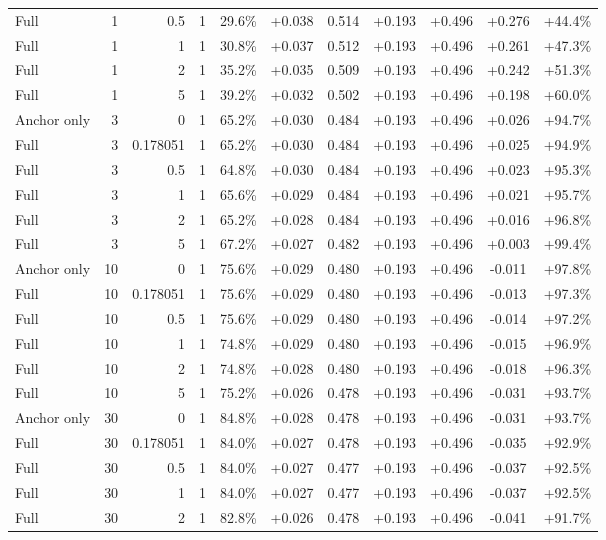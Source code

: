 \begin{table}[htbp]
\begin{tabular}{lrrrccccccc}
Full & 1 & 0.5 & 1 & 29.6\% & +0.038 & 0.514 & +0.193 & +0.496 & +0.276 & +44.4\% \\
Full & 1 & 1 & 1 & 30.8\% & +0.037 & 0.512 & +0.193 & +0.496 & +0.261 & +47.3\% \\
Full & 1 & 2 & 1 & 35.2\% & +0.035 & 0.509 & +0.193 & +0.496 & +0.242 & +51.3\% \\
Full & 1 & 5 & 1 & 39.2\% & +0.032 & 0.502 & +0.193 & +0.496 & +0.198 & +60.0\% \\
Anchor only & 3 & 0 & 1 & 65.2\% & +0.030 & 0.484 & +0.193 & +0.496 & +0.026 & +94.7\% \\
Full & 3 & 0.178051 & 1 & 65.2\% & +0.030 & 0.484 & +0.193 & +0.496 & +0.025 & +94.9\% \\
Full & 3 & 0.5 & 1 & 64.8\% & +0.030 & 0.484 & +0.193 & +0.496 & +0.023 & +95.3\% \\
Full & 3 & 1 & 1 & 65.6\% & +0.029 & 0.484 & +0.193 & +0.496 & +0.021 & +95.7\% \\
Full & 3 & 2 & 1 & 65.2\% & +0.028 & 0.484 & +0.193 & +0.496 & +0.016 & +96.8\% \\
Full & 3 & 5 & 1 & 67.2\% & +0.027 & 0.482 & +0.193 & +0.496 & +0.003 & +99.4\% \\
Anchor only & 10 & 0 & 1 & 75.6\% & +0.029 & 0.480 & +0.193 & +0.496 & -0.011 & +97.8\% \\
Full & 10 & 0.178051 & 1 & 75.6\% & +0.029 & 0.480 & +0.193 & +0.496 & -0.013 & +97.3\% \\
Full & 10 & 0.5 & 1 & 75.6\% & +0.029 & 0.480 & +0.193 & +0.496 & -0.014 & +97.2\% \\
Full & 10 & 1 & 1 & 74.8\% & +0.029 & 0.480 & +0.193 & +0.496 & -0.015 & +96.9\% \\
Full & 10 & 2 & 1 & 74.8\% & +0.028 & 0.480 & +0.193 & +0.496 & -0.018 & +96.3\% \\
Full & 10 & 5 & 1 & 75.2\% & +0.026 & 0.478 & +0.193 & +0.496 & -0.031 & +93.7\% \\
Anchor only & 30 & 0 & 1 & 84.8\% & +0.028 & 0.478 & +0.193 & +0.496 & -0.031 & +93.7\% \\
Full & 30 & 0.178051 & 1 & 84.0\% & +0.027 & 0.478 & +0.193 & +0.496 & -0.035 & +92.9\% \\
Full & 30 & 0.5 & 1 & 84.0\% & +0.027 & 0.477 & +0.193 & +0.496 & -0.037 & +92.5\% \\
Full & 30 & 1 & 1 & 84.0\% & +0.027 & 0.477 & +0.193 & +0.496 & -0.037 & +92.5\% \\
Full & 30 & 2 & 1 & 82.8\% & +0.026 & 0.478 & +0.193 & +0.496 & -0.041 & +91.7\% \\

\end{tabular}
\end{table}
